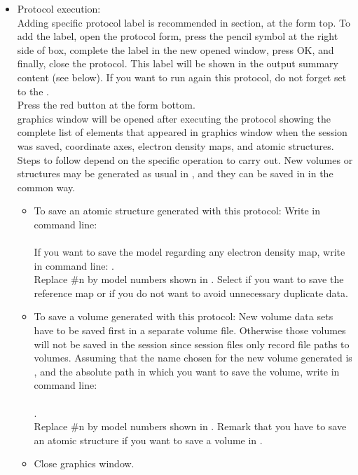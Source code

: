 \begin{itemize}
\begin{itemize}
    \end{itemize}

  \item Protocol execution:\\
  
  Adding specific protocol label is recommended in  section, at the form top. To add the label, open the protocol form, press the pencil symbol at the right side of  box, complete the label in the new opened window, press OK, and finally, close the protocol. This label will be shown in the output summary content (see below). If you want to run again this protocol, do not forget set to  the .\\
  Press the  red button at the form bottom.\\
  
  \chimera graphics window will be opened after executing the protocol showing the complete list of elements that appeared in \chimera graphics window when the session was saved, coordinate axes, electron density maps, and atomic structures. Steps to follow depend on the specific operation to carry out. New volumes or structures may be generated as usual in \chimera, and they can be saved in \scipion in the common way.\\
  \begin{itemize}
   
   \item To save an atomic structure generated with this protocol:
   Write in \chimera command line:\\
   \\
   If you want to save the model regarding any electron density map, write in \chimera command line:
   .\\Replace \#n by model numbers shown in \chimera {}. Select  if you want to save the reference map or  if you do not want to avoid unnecessary duplicate data.
   \item To save a volume generated with this protocol:
   New volume data sets have to be saved first in a separate volume file. Otherwise those volumes will not be saved in the \chimera session since session files only record file paths to volumes. Assuming that the name chosen for the new volume generated is , and  the absolute path in which you want to save the volume, write in \chimera command line:\\
   \\
   .\\Replace \#n by model numbers shown in \chimera {}. Remark that you have to save an atomic structure if you want to save a volume in \scipion.\\
   \item Close \chimera graphics window.


\end{itemize}
\end{itemize}
